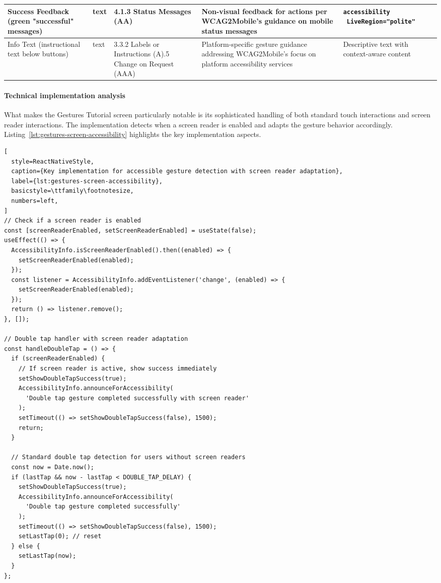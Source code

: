 \begin{longtable}[c]{|C{2.5cm}|C{2cm}|C{2.8cm}|C{3.5cm}|C{4.7cm}|}
\hline
Success Feedback (green "successful" messages) & text & 4.1.3 Status Messages (AA) & Non-visual feedback for actions per WCAG2Mobile's guidance on mobile status messages & \texttt{accessibility \ LiveRegion="polite"} \\
\hline
Info Text (instructional text below buttons) & text & 3.3.2 Labels or Instructions (A).5 Change on Request (AAA) & Platform-specific gesture guidance addressing WCAG2Mobile's focus on platform accessibility services & Descriptive text with context-aware content \\
\hline
\end{longtable}
\FloatBarrier

\paragraph{Technical implementation analysis}

What makes the Gestures Tutorial screen particularly notable is its sophisticated handling of both standard touch interactions and screen reader interactions. The implementation detects when a screen reader is enabled and adapts the gesture behavior accordingly. Listing~\ref{lst:gestures-screen-accessibility} highlights the key implementation aspects.

\begin{lstlisting}[
  style=ReactNativeStyle,
  caption={Key implementation for accessible gesture detection with screen reader adaptation},
  label={lst:gestures-screen-accessibility},
  basicstyle=\ttfamily\footnotesize,
  numbers=left,
]
// Check if a screen reader is enabled
const [screenReaderEnabled, setScreenReaderEnabled] = useState(false);
useEffect(() => {
  AccessibilityInfo.isScreenReaderEnabled().then((enabled) => {
    setScreenReaderEnabled(enabled);
  });
  const listener = AccessibilityInfo.addEventListener('change', (enabled) => {
    setScreenReaderEnabled(enabled);
  });
  return () => listener.remove();
}, []);

// Double tap handler with screen reader adaptation
const handleDoubleTap = () => {
  if (screenReaderEnabled) {
    // If screen reader is active, show success immediately
    setShowDoubleTapSuccess(true);
    AccessibilityInfo.announceForAccessibility(
      'Double tap gesture completed successfully with screen reader'
    );
    setTimeout(() => setShowDoubleTapSuccess(false), 1500);
    return;
  }

  // Standard double tap detection for users without screen readers
  const now = Date.now();
  if (lastTap && now - lastTap < DOUBLE_TAP_DELAY) {
    setShowDoubleTapSuccess(true);
    AccessibilityInfo.announceForAccessibility(
      'Double tap gesture completed successfully'
    );
    setTimeout(() => setShowDoubleTapSuccess(false), 1500);
    setLastTap(0); // reset
  } else {
    setLastTap(now);
  }
};
\end{lstlisting}
\FloatBarrier

